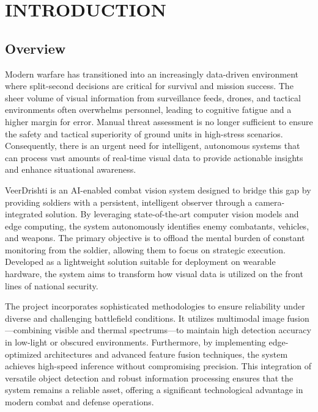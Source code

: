 \chapter{INTRODUCTION}\label{ch:introduction}

\section{Overview}\label{sec:overview}
Modern warfare has transitioned into an increasingly data-driven environment where split-second
decisions are critical for survival and mission success. The sheer volume of visual information from
surveillance feeds, drones, and tactical environments often overwhelms personnel, leading to
cognitive fatigue and a higher margin for error. Manual threat assessment is no longer sufficient to
ensure the safety and tactical superiority of ground units in high-stress scenarios. Consequently,
there is an urgent need for intelligent, autonomous systems that can process vast amounts of
real-time visual data to provide actionable insights and enhance situational awareness. \vspace{6pt}

VeerDrishti is an AI-enabled combat vision system designed to bridge this gap by providing soldiers
with a persistent, intelligent observer through a camera-integrated solution. By leveraging
state-of-the-art computer vision models and edge computing, the system autonomously identifies enemy
combatants, vehicles, and weapons. The primary objective is to offload the mental burden of constant
monitoring from the soldier, allowing them to focus on strategic execution. Developed as a
lightweight solution suitable for deployment on wearable hardware, the system aims to transform how
visual data is utilized on the front lines of national security. \vspace{6pt}

The project incorporates sophisticated methodologies to ensure reliability under diverse and
challenging battlefield conditions. It utilizes multimodal image fusion—combining visible and
thermal spectrums—to maintain high detection accuracy in low-light or obscured environments.
Furthermore, by implementing edge-optimized architectures and advanced feature fusion techniques,
the system achieves high-speed inference without compromising precision. This integration of
versatile object detection and robust information processing ensures that the system remains a
reliable asset, offering a significant technological advantage in modern combat and defense
operations.

